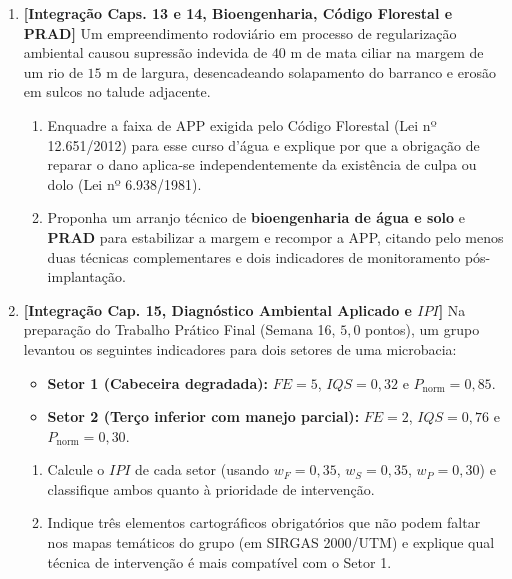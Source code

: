 \begin{enumerate}[leftmargin=1.8em, itemsep=8pt, start=9]
  \item \textbf{[Integração Caps. 13 e 14, Bioengenharia, Código Florestal e PRAD]} Um empreendimento rodoviário em processo de regularização ambiental causou supressão indevida de $40\text{ m}$ de mata ciliar na margem de um rio de $15\text{ m}$ de largura, desencadeando solapamento do barranco e erosão em sulcos no talude adjacente.
  \begin{enumerate}[label=(\alph*), leftmargin=1.6em, itemsep=2pt]
    \item Enquadre a faixa de APP exigida pelo Código Florestal (Lei nº 12.651/2012) para esse curso d'água e explique por que a obrigação de reparar o dano aplica-se independentemente da existência de culpa ou dolo (Lei nº 6.938/1981).
    \item Proponha um arranjo técnico de \textbf{bioengenharia de água e solo} e \textbf{PRAD} para estabilizar a margem e recompor a APP, citando pelo menos duas técnicas complementares e dois indicadores de monitoramento pós-implantação.
  \end{enumerate}
  \espacoResolucao[4.0cm]

  \item \textbf{[Integração Cap. 15, Diagnóstico Ambiental Aplicado e $IPI$]} Na preparação do Trabalho Prático Final (Semana 16, $5{,}0$ pontos), um grupo levantou os seguintes indicadores para dois setores de uma microbacia:
  \begin{itemize}[leftmargin=1.4em, itemsep=1.5pt]
    \item \textbf{Setor 1 (Cabeceira degradada):} $FE = 5$, $IQS = 0{,}32$ e $P_{\text{norm}} = 0{,}85$.
    \item \textbf{Setor 2 (Terço inferior com manejo parcial):} $FE = 2$, $IQS = 0{,}76$ e $P_{\text{norm}} = 0{,}30$.
  \end{itemize}
  \begin{enumerate}[label=(\alph*), leftmargin=1.6em, itemsep=2pt]
    \item Calcule o $IPI$ de cada setor (usando $w_F = 0{,}35$, $w_S = 0{,}35$, $w_P = 0{,}30$) e classifique ambos quanto à prioridade de intervenção.
    \item Indique três elementos cartográficos obrigatórios que não podem faltar nos mapas temáticos do grupo (em SIRGAS 2000/UTM) e explique qual técnica de intervenção é mais compatível com o Setor 1.
  \end{enumerate}
  \espacoResolucao[4.2cm]
\end{enumerate}

